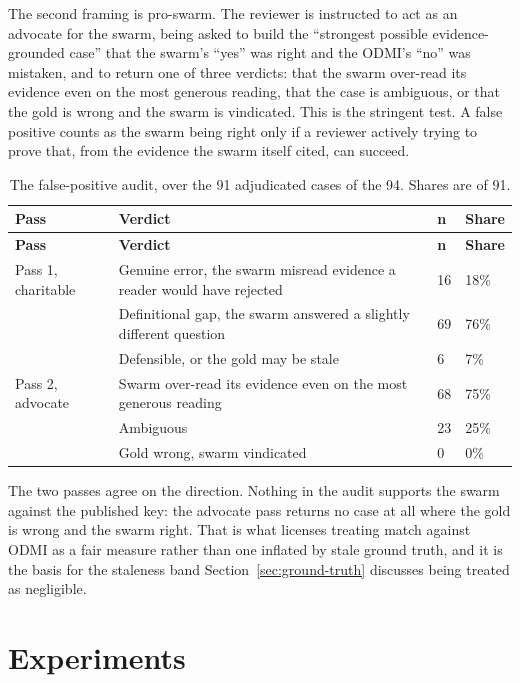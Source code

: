 The second framing is pro-swarm. The reviewer is instructed to act as an advocate for the swarm, being asked to build the ``strongest possible evidence-grounded case'' that the swarm's ``yes'' was right and the ODMI's ``no'' was mistaken, and to return one of three verdicts: that the swarm over-read its evidence even on the most generous reading, that the case is ambiguous, or that the gold is wrong and the swarm is vindicated. This is the stringent test. A false positive counts as the swarm being right only if a reviewer actively trying to prove that, from the evidence the swarm itself cited, can succeed.

{\footnotesize
\begin{longtable}[]{@{}
  L{0.1671}
  L{0.5504}
  L{0.0688}
  L{0.0885}@{}}
\caption{The false-positive audit, over the 91 adjudicated cases of the 94. Shares are of 91.}\label{tab:fp-audit}\\
\toprule\noalign{}
\textbf{Pass} & \textbf{Verdict} & \textbf{n} & \textbf{Share} \\
\midrule\noalign{}
\endfirsthead
\toprule\noalign{}
\textbf{Pass} & \textbf{Verdict} & \textbf{n} & \textbf{Share} \\
\midrule\noalign{}
\endhead
\bottomrule\noalign{}
\endlastfoot
Pass 1, charitable & Genuine error, the swarm misread evidence a reader would have rejected & 16 & 18\% \\
& Definitional gap, the swarm answered a slightly different question & 69 & 76\% \\
& Defensible, or the gold may be stale & 6 & 7\% \\
Pass 2, advocate & Swarm over-read its evidence even on the most generous reading & 68 & 75\% \\
& Ambiguous & 23 & 25\% \\
& Gold wrong, swarm vindicated & 0 & 0\% \\
\end{longtable}
}


The two passes agree on the direction. Nothing in the audit supports the swarm against the published key: the advocate pass returns no case at all where the gold is wrong and the swarm right. That is what licenses treating match against ODMI as a fair measure rather than one inflated by stale ground truth, and it is the basis for the staleness band Section~\ref{sec:ground-truth} discusses being treated as negligible.

\chapter{Experiments}\label{app:experiments}

